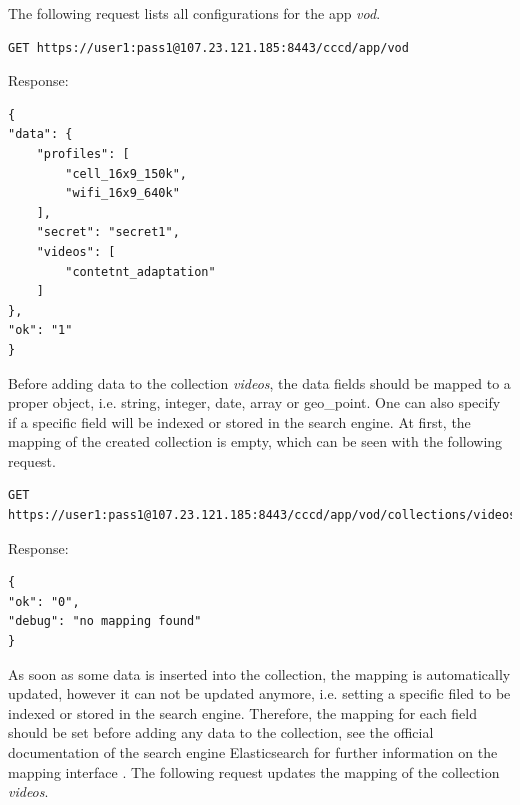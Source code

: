 The following request lists all configurations for the app \textit{vod}.

\begin{code}
\begin{verbatim}
GET https://user1:pass1@107.23.121.185:8443/cccd/app/vod
\end{verbatim}
Response:
\begin{verbatim}
{
"data": {
	"profiles": [
		"cell_16x9_150k",
		"wifi_16x9_640k"
	],
	"secret": "secret1",
	"videos": [
		"contetnt_adaptation"
	]
},
"ok": "1"
}
\end{verbatim}
\end{code}

Before adding data to the collection \textit{videos}, the data fields should be mapped to a proper object, i.e. string, integer, date, array or geo\_point. One can also specify if a specific field will be indexed or stored in the search engine. At first, the mapping of the created collection is empty, which can be seen with the following request.

\begin{code}
\begin{verbatim}
GET https://user1:pass1@107.23.121.185:8443/cccd/app/vod/collections/videos/mapping
\end{verbatim}
Response:
\begin{verbatim}
{
"ok": "0",
"debug": "no mapping found"
}
\end{verbatim}
\end{code}

As soon as some data is inserted into the collection, the mapping is automatically updated, however it can not be updated anymore, i.e. setting a specific filed to be indexed or stored in the search engine. Therefore, the mapping for each field should be set before adding any data to the collection, see the official documentation of the search engine Elasticsearch for further information on the mapping interface \cite{elastic_mapping}. The following request updates the mapping of the collection \textit{videos}.

